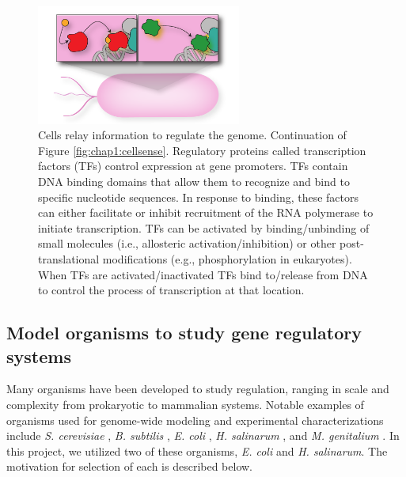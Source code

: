 \begin{figure}[h!]
    \centering
    \includegraphics[width=0.6\textwidth]{figures/cell_env_internall}
 	\caption[Cells relay information to regulate the genome]{Cells relay information to regulate the genome. Continuation of Figure \ref{fig:chap1:cellsense}. Regulatory proteins called transcription factors (TFs) control expression at gene promoters. TFs contain DNA binding domains that allow them to recognize and bind to specific nucleotide sequences. In response to binding, these factors can either facilitate or inhibit recruitment of the RNA polymerase to initiate transcription. TFs can be activated by binding/unbinding of small molecules (i.e., allosteric activation/inhibition) or other post-translational modifications (e.g., phosphorylation in eukaryotes). When TFs are activated/inactivated TFs bind to/release from DNA to control the process of transcription at that location.}
    \label{fig:chap1:cellrelay}
\end{figure}

\subsection{Model organisms to study gene regulatory systems}

Many organisms have been developed to study regulation, ranging in scale and complexity from prokaryotic to mammalian systems. Notable examples of organisms used for genome-wide modeling and experimental characterizations include \textit{S. cerevisiae} \cite{schwikowski_network_2000, segal_module_2003}, \textit{B. subtilis} \cite{oh_genome-scale_2007}, \textit{E. coli} \cite{huerta_regulondb:_1998}, \textit{H. salinarum} \cite{bonneau_predictive_2007}, and \textit{M. genitalium} \cite{karr_whole-cell_2012}. In this project, we utilized two of these organisms, \textit{E. coli} and \textit{H. salinarum}. The motivation for selection of each is described below.

